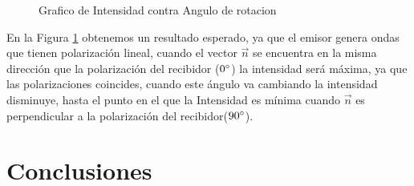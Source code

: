 \documentclass[aps,prl,reprint]{revtex4-1}
\begin{document}
\begin{figure}[H]
 \caption{Grafico de Intensidad contra Angulo de rotacion}
 \label{gmonta1.2}
\end{figure}
En la Figura \ref{gmonta1.2} obtenemos un resultado esperado, ya que el emisor genera ondas que tienen polarización lineal, cuando el vector $\vec{n}$ se encuentra en la misma dirección que la polarización del recibidor ($0\degree$) la intensidad será máxima, ya que las polarizaciones coincides, cuando este ángulo va cambiando la intensidad disminuye, hasta el punto en el que la Intensidad es mínima cuando $\vec{n}$ es perpendicular a la polarización del recibidor($90\degree$).


\section{Conclusiones}
\end{document}
